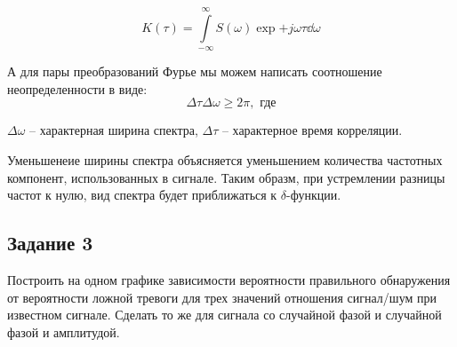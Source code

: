 \begin{equation}
    K(\tau) = \int\limits_{-\infty}^{\infty} S(\omega) \exp{+j\omega\tau} \dd{\omega}
\end{equation}

А для пары преобразований Фурье мы можем написать соотношение неопределенности
в виде:
\begin{equation}
    \Delta \tau  \Delta \omega \geq 2\pi, \text{ где}
\end{equation} 

$\Delta \omega$ -- характерная ширина спектра, $\Delta \tau$ -- характерное время корреляции.

Уменьшенеие ширины спектра объясняется уменьшением количества частотных компонент, использованных 
в сигнале. Таким образм, при устремлении разницы частот к нулю, вид спектра будет приближаться к $\delta$-функции.


\subsection{Задание 3}
Построить на одном графике зависимости вероятности правильного
обнаружения от вероятности ложной тревоги для трех значений
отношения сигнал/шум при известном сигнале. Сделать то же для сигнала
со случайной фазой и случайной фазой и амплитудой. 

